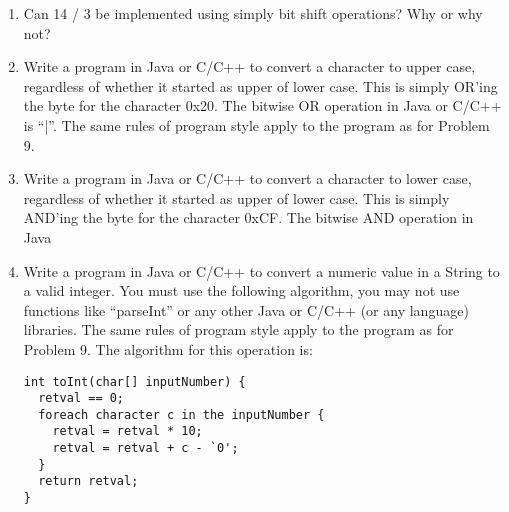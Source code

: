 \documentclass[12pt]{article}
\begin{document}
\begin{enumerate}
    \item Can 14 / 3 be implemented using simply bit shift operations? Why or why not?

    \item Write a program in Java or C/C++ to convert a character to upper case, regardless of whether it started as upper of lower case. This is simply OR’ing the byte for the character 0x20. The bitwise OR operation in Java or C/C++ is “|”. The same rules of program style apply to the program as for Problem 9.

    \item Write a program in Java or C/C++ to convert a character to lower case, regardless of whether it started as upper of lower case. This is simply AND’ing the byte for the character 0xCF. The bitwise AND operation in Java

    \item Write a program in Java or C/C++ to convert a numeric value in a String to a valid integer. You must use the following algorithm, you may not use functions like “parseInt” or any other Java or C/C++ (or any language) libraries. The same rules of program style apply to the program as for Problem 9. The algorithm for this operation is:


\begin{lstlisting}
int toInt(char[] inputNumber) {
  retval == 0;
  foreach character c in the inputNumber {
    retval = retval * 10;
    retval = retval + c - `0';
  }
  return retval;
}
\end{lstlisting}

  \end{enumerate}
\end{document}

